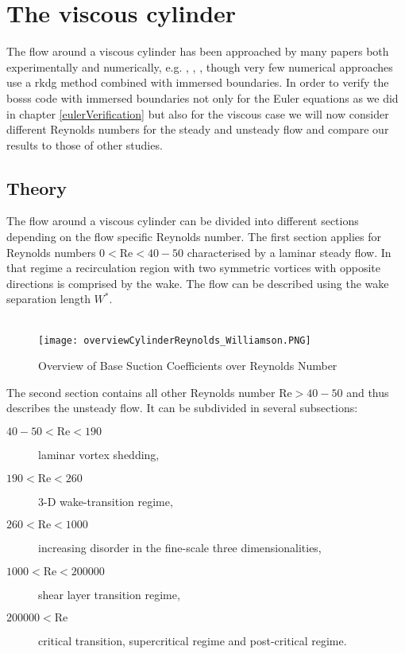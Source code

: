 \chapter{The viscous cylinder}
The flow around a viscous cylinder has been approached by many papers both experimentally and numerically, e.g. \cite{williamson1996vortex}, \cite{FLM:14223}, \cite{canutoTaira}, though very few numerical approaches use a \gls{rkdg} method combined with immersed boundaries. In order to verify the \gls{bosss} code with immersed boundaries not only for the Euler equations as we did in chapter \ref{eulerVerification} but also for the viscous case we will now consider different Reynolds numbers for the steady and unsteady flow and compare our results to those of other studies.

\section{Theory}
	The flow around a viscous cylinder can be divided into different sections depending on the flow specific Reynolds number. The first section applies for Reynolds numbers $0 < \text{Re} < 40-50$ characterised by a laminar steady flow. In that regime a recirculation region with two symmetric vortices with opposite directions is comprised by the wake. The flow can be described using the wake separation length $W^*$.\\\\
	\begin{figure}[htp]
		\centering
		\texttt{[image: overviewCylinderReynolds\_Williamson.PNG]}
		\caption{Overview of Base Suction Coefficients over Reynolds Number }
		\label{fig:overview}
	\end{figure} 
	The second section contains all other Reynolds number $\text{Re}> 40-50$ and thus describes the unsteady flow. It can be subdivided in several subsections:
	\begin{description}
		\item[$40-50 < \text{Re} < 190$] laminar vortex shedding,
		\item[$190 < \text{Re} < 260$] 3-D wake-transition regime,
		\item[$260 < \text{Re} < 1000$] increasing disorder in the fine-scale three dimensionalities,
		\item[$1000 < \text{Re} < 200000$] shear layer transition regime,
		\item[$200000 < \text{Re}$] critical transition, supercritical regime and post-critical regime.
	\end{description}
	
